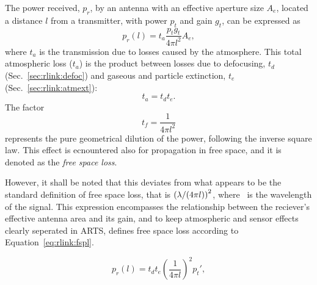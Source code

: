 The power received, $p_r$, by an antenna with an effective aperture size
$A_e$, located a distance $l$ from a transmitter, with power
$p_t$ and gain $g_t$, can be expressed as
\begin{equation}
  \label{eq:rlink:start}
  p_r(l) = t_a\frac{p_tg_t}{4\pi l^2}A_e,
\end{equation}
where $t_a$ is the transmission due to losses caused by the atmosphere. This
total atmospheric loss ($t_a$) is the product between losses due to defocusing,
$t_d$ (Sec.~\ref{sec:rlink:defoc}) and gaseous and particle extinction, $t_e$
(Sec.~\ref{sec:rlink:atmext}):
\begin{equation}
  t_a = t_d t_e.
\end{equation}
The factor
\begin{equation}
  \label{eq:rlink:fspl}
  t_f = \frac{1}{4\pi l^2}
\end{equation}
represents the pure geometrical dilution of the power, following the inverse
square law. This effect is ecnountered also for propagation in free space, and
it is denoted as the \emph{free space loss}. 

However, it shall be noted that this deviates from what appears to be the
standard definition of free space loss, that is $\left(\lambda/(4 \pi
l)\right)^2$, where \Wvl\ is the wavelength of the signal. This expression
encompasses the relationship between the reciever's effective antenna area and
its gain, and to keep atmospheric and sensor effects clearly seperated in ARTS,
 defines free space loss according to
Equation~\ref{eq:rlink:fspl}.

\begin{equation}
  p_r(l) = t_d t_e \left(\frac{1}{4\pi l} \right)^2 p_t',
\end{equation}


